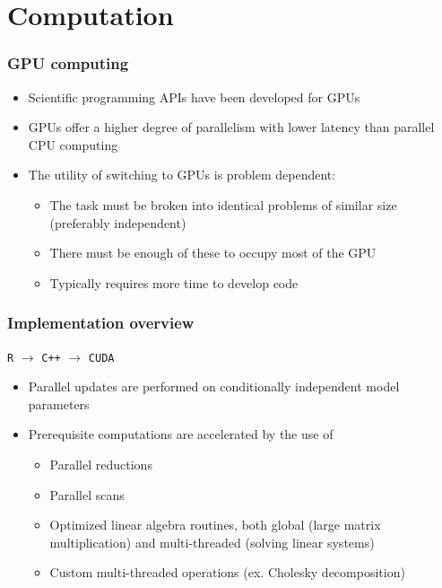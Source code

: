 \documentclass[handout]{beamer}
\begin{document}
\section{Computation}

\begin{frame}%
  \frametitle{GPU computing}
  \begin{itemize}
    \item Scientific programming APIs have been developed for GPUs
    \item GPUs offer a higher degree of parallelism with lower latency than parallel CPU computing
    \item The utility of switching to GPUs is problem dependent:
    \begin{itemize}
      \item The task must be broken into identical problems of similar size (preferably independent)
      \item There must be enough of these to occupy most of the GPU
      \item Typically requires more time to develop code
    \end{itemize}
  \end{itemize}
\end{frame}

\begin{frame}%
  \frametitle{Implementation overview}
  \texttt{R} $\rightarrow$ \texttt{C++} $\rightarrow$ \texttt{CUDA}
  \begin{itemize}
    \pause\item Parallel updates are performed on conditionally independent model parameters
    \pause\item Prerequisite computations are accelerated by the use of
    \begin{itemize}
      \pause\item Parallel reductions
      \pause\item Parallel scans
      \pause\item Optimized linear algebra routines, both global (large matrix multiplication) and multi-threaded (solving linear systems)
      \pause\item Custom multi-threaded operations (ex. Cholesky decomposition)
    \end{itemize}
  \end{itemize}
\end{frame}
\end{document}
